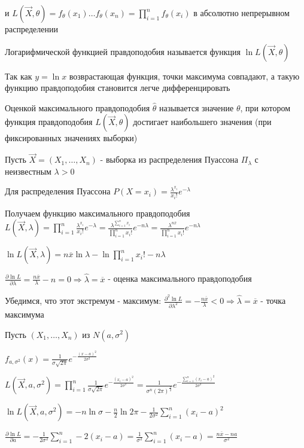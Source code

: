 \documentclass[12pt]{article}
\begin{document}
и $L(\vec{X}, \theta) = f_\theta(x_1) \dots f_\theta(x_n) = \prod_{i = 1}^n f_\theta(x_i)$ в абсолютно непрерывном распределении

\Def Логарифмической функцией правдоподобия называется функция $\ln L(\vec{X}, \theta)$

\Nota Так как $y = \ln x$ возврастающая функция, точки максимума совпадают, а такую функцию правдоподобия становится легче дифференцировать

\Def Оценкой максимального правдоподобия $\hat{\theta}$ называется значение $\theta$, при котором функция правдоподобия 
$L(\vec{X}, \theta)$ достигает наибольшего значения (при фиксированных значениях выборки)

 Пусть $\vec{X} = (X_1, \dots, X_n)$ - выборка из распределения Пуассона $\Pi_\lambda$ с неизвестным $\lambda > 0$

\Mem Для распределения Пуассона $P(X = x_i) = \frac{\lambda^{x_i}}{x_i!} e^{-\lambda}$

Получаем функцию максимального правдоподобия $L(\vec{X}, \lambda) = \prod_{i = 1}^n \frac{\lambda^{x_i}}{x_i!} e^{-\lambda} = 
\frac{\lambda^{\sum_{i = 1}^n x_i}}{\prod_{i = 1}^n x_i!} e^{-n\lambda} = \frac{\lambda^{n \overline{x}}}{\prod_{i = 1}^n x_i!} e^{-n\lambda}$

$\ln L(\vec{X}, \lambda) = n \overline{x} \ln \lambda - \ln \prod_{i = 1}^n x_i! - n\lambda$

$\frac{\partial \ln L}{\partial \lambda} = \frac{n \overline{x}}{\lambda} - n = 0 \Longrightarrow \hat{\lambda} = \overline{x}$ - оценка максимального правдоподобия

Убедимся, что этот экстремум - максимум: $\frac{\partial^2 \ln L}{\partial \lambda^2} = -\frac{n \overline{x}}{\lambda} < 0 \Longrightarrow \hat{\lambda} = \overline{x}$ - точка максимума

 Пусть $(X_1, \dots, X_n)$ из $N(a, \sigma^2)$

$f_{a, \sigma^2} (x) = \frac{1}{\sigma \sqrt{2\pi}} e^{-\frac{(x - a)^2}{2\sigma^2}}$

$L(\vec{X}, a, \sigma^2) = \prod_{i = 1}^n \frac{1}{\sigma \sqrt{2\pi}} e^{-\frac{(x_i - a)^2}{2\sigma^2}} = 
\frac{1}{\sigma^n (2\pi)^{\frac{n}{2}}} e^{-\frac{\sum_{i = 1}^n (x_i - a)^2}{2\sigma^2}}$

$\ln L(\vec{X}, a, \sigma^2) = -n\ln \sigma - \frac{n}{2} \ln 2\pi - \frac{1}{2\sigma^2}\sum_{i = 1}^n (x_i - a)^2$

$\frac{\partial \ln L}{\partial a} = -\frac{1}{2\sigma^2} \sum_{i = 1}^n -2(x_i - a) = \frac{1}{\sigma^2} \sum_{i = 1}^n (x_i - a) = \frac{n\overline{x} - na}{\sigma^2}$
\end{document}
